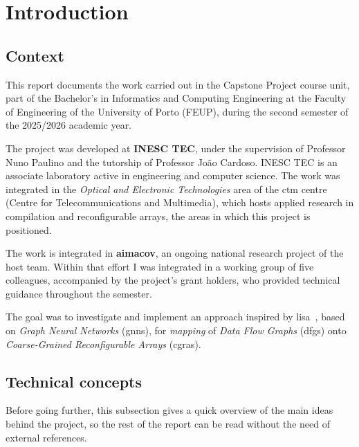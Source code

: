 \documentclass[10pt]{article}
\begin{document}
\clearpage

\printglossary[title=Glossary,toctitle=Glossary]

\clearpage

\section{Introduction}

\subsection{Context}

This report documents the work carried out in the Capstone Project course unit, part of the Bachelor's in Informatics and Computing Engineering at the Faculty of Engineering of the University of Porto (FEUP), during the second semester of the 2025/2026 academic year.

The project was developed at \textbf{INESC TEC}, under the supervision of Professor Nuno Paulino and the tutorship of Professor João Cardoso. INESC TEC is an associate laboratory active in engineering and computer science. The work was integrated in the \textit{Optical and Electronic Technologies} area of the \gls{ctm} centre (Centre for Telecommunications and Multimedia), which hosts applied research in compilation and reconfigurable arrays, the areas in which this project is positioned.

The work is integrated in \textbf{\gls{aimacov}}, an ongoing national research project of the host team. Within that effort I was integrated in a working group of five colleagues, accompanied by the project's grant holders, who provided technical guidance throughout the semester.

The goal was to investigate and implement an approach inspired by \gls{lisa}~\cite{lisa2022}, based on \textit{Graph Neural Networks} (\glspl{gnn}), for \textit{\gls{mapping}} of \textit{Data Flow Graphs} (\glspl{dfg}) onto \textit{Coarse-Grained Reconfigurable Arrays} (\glspl{cgra}).

\subsection{Technical concepts}

Before going further, this subsection gives a quick overview of the main ideas behind the project, so the rest of the report can be read without the need of external references.
\end{document}

